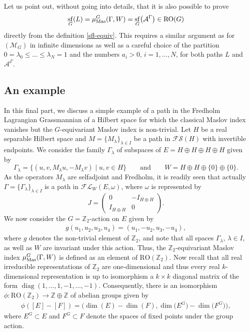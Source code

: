 \documentclass[pdftex]{sigma}
\numberwithin{equation}{section}
\theoremstyle{definition}
\DeclareMathOperator{\sfl}{sf}
\DeclareMathOperator{\diag}{diag}
\begin{document}
Let us point out, without going into details, that it is also possible to prove
\[
\sfl_G(L)=\mu^G_{\rm Mas}(\Gamma,W)=\sfl_G\bigl(\mathcal{A}^\Gamma\bigr)\in \mathrm{RO}(G)
\] directly from the definition \eqref{sfl-equiv}. This requires a similar argument as for $(\mathcal{M}_G)$ in infinite dimensions as well as a careful choice of the partition $0=\lambda_0\leq\dots\leq\lambda_N=1$ and the numbers $a_i>0$, $i=1,\dots,N$, for both paths $L$ and $\mathcal{A}^\Gamma$.

\subsection{An example}
In this final part, we discuss a simple example of a path in the Fredholm Lagrangian Grassmannian of a Hilbert space for which the classical Maslov index vanishes but the $G$-equivariant Maslov index is non-trivial. Let $H$ be a real separable Hilbert space and $M=\{M_\lambda\}_{\lambda\in I}$ be a path in $\mathcal{FS}(H)$ with invertible endpoints. We consider the family $\Gamma_\lambda$ of subspaces of $E=H\oplus H\oplus H\oplus H$ given by
\[\Gamma_\lambda=\{(u,v,M_\lambda u,-M_\lambda v) \mid u,v \in H\}\qquad\text{and}\qquad W=H\oplus H\oplus\{0\}\oplus\{0\}.\]
As the operators $M_\lambda$ are selfadjoint and Fredholm, it is readily seen that actually $\Gamma=\{\Gamma_\lambda\}_{\lambda\in I}$ is a path in $\mathcal{FL}_W(E,\omega)$, where $\omega$ is represented by
\[J=\begin{pmatrix}
0&-I_{H\oplus H}\\
I_{H\oplus H}&0
\end{pmatrix}.\]
We now consider the $G=\mathbb{Z}_2$-action on $E$ given by
\begin{align}\label{action}
g(u_1,u_2,u_3,u_4)=(u_1,-u_2,u_3,-u_4),
\end{align}
where $g$ denotes the non-trivial element of $\mathbb{Z}_2$, and note that all spaces $\Gamma_\lambda$, $\lambda\in I$, as well as $W$ are invariant under this action. Thus, the $\mathbb{Z}_2$-equivariant Maslov index $\mu^G_{\rm Mas}(\Gamma,W)$ is defined as an element of $\mathrm{RO}(\mathbb{Z}_2)$. Now recall that all real irreducible representations of $\mathbb{Z}_2$ are one-dimensional and thus every real $k$-dimensional representation is up to isomorphism a $k\times k$ diagonal matrix of the form $\diag(1,\dots,1,-1,\dots,-1)$. Consequently, there is an isomorphism $\phi \colon \mathrm{RO}(\mathbb{Z}_2)\rightarrow\mathbb{Z}\oplus\mathbb{Z}$ of abelian groups given by{\samepage
\begin{align}\label{phi}
 \phi([E]-[F])=\bigl(\dim(E)-\dim(F),\dim\bigl(E^G\bigr)-\dim\bigl(F^G\bigr)\bigr),
\end{align}
where $E^G\subset E$ and $F^G\subset F$ denote the spaces of fixed points under the group action.}
\end{document}
